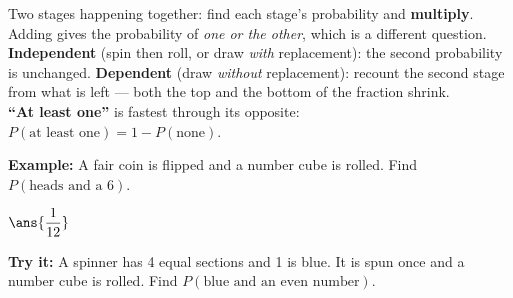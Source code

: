 \documentclass[12pt]{article}
\begin{document}
\begin{formulabox}
Two stages happening together: find each stage's probability and
\textbf{multiply}. Adding gives the probability of \emph{one or the other},
which is a different question.\\[3pt]
\textbf{Independent} (spin then roll, or draw \emph{with} replacement): the
second probability is unchanged. \textbf{Dependent} (draw \emph{without}
replacement): recount the second stage from what is left --- both the top and
the bottom of the fraction shrink.\\[3pt]
\textbf{``At least one''} is fastest through its opposite:
$P(\text{at least one}) = 1 - P(\text{none})$.
\end{formulabox}
\begin{examplebox}
\textbf{Example:} A fair coin is flipped and a number cube is rolled. Find
$P(\text{heads and a } 6)$.
\par
$\ans{\dfrac{1}{12}}$
\end{examplebox}
\begin{tryitbox}
\textbf{Try it:} A spinner has 4 equal sections and 1 is blue. It is spun once
and a number cube is rolled. Find $P(\text{blue and an even number})$.\\[2pt]
\end{tryitbox}
\end{document}
